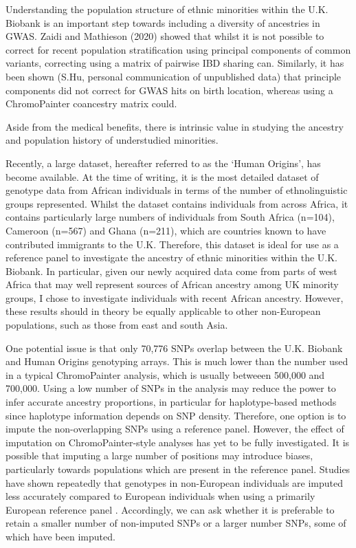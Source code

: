 Understanding the population structure of ethnic minorities within the U.K. Biobank is an important step towards including a diversity of ancestries in GWAS. Zaidi and Mathieson (2020) \cite{zaidi2020demographic} showed that whilst it is not possible to correct for recent population stratification using principal components of common variants, correcting using a matrix of pairwise IBD sharing can. Similarly, it has been shown (S.Hu, personal communication of unpublished data) that principle components did not correct for GWAS hits on birth location, whereas using a ChromoPainter coancestry matrix could. 

Aside from the medical benefits, there is intrinsic value in studying the ancestry and population history of understudied minorities. 


Recently, a large dataset, hereafter referred to as the `Human Origins', has become available. At the time of writing, it is the most detailed dataset of genotype data from African individuals in terms of the number of ethnolinguistic groups represented. Whilst the dataset contains individuals from across Africa, it contains particularly large numbers of individuals from South Africa (n=104), Cameroon (n=567) and Ghana (n=211), which are countries known to have contributed immigrants to the U.K. Therefore, this dataset is ideal for use as a reference panel to investigate the ancestry of ethnic minorities within the U.K. Biobank. In particular, given our newly acquired data come from parts of west Africa that may well represent sources of African ancestry among UK minority groups, I chose to investigate individuals with recent African ancestry. However, these results should in theory be equally applicable to other non-European populations, such as those from east and south Asia. 

One potential issue is that only 70,776 SNPs overlap between the U.K. Biobank and Human Origins genotyping arrays. This is much lower than the number used in a typical ChromoPainter analysis, which is usually betweeen 500,000 and 700,000. Using a low number of SNPs in the analysis may reduce the power to infer accurate ancestry proportions, in particular for haplotype-based methods since haplotype information depends on SNP density. Therefore, one option is to impute the non-overlapping SNPs using a reference panel. However, the effect of imputation on ChromoPainter-style analyses has yet to be fully investigated. It is possible that imputing a large number of positions may introduce biases, particularly towards populations which are present in the reference panel. Studies have shown repeatedly that genotypes in non-European individuals are imputed less accurately compared to European individuals when using a primarily European reference panel \cite{delaneau2018integrative, taliun2021sequencing}. Accordingly, we can ask whether it is preferable to retain a smaller number of non-imputed SNPs or a larger number SNPs, some of which have been imputed. 

